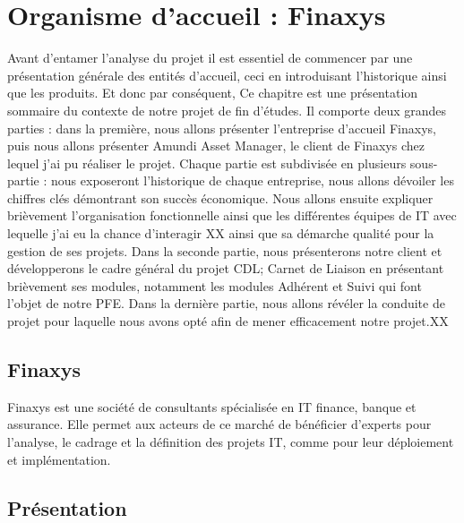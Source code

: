 \setlength{\parskip}{0.8em}



\chapter{Organisme d’accueil : Finaxys} %

\label{Chapter01} %

\par
Avant d'entamer l’analyse du projet il est essentiel de commencer par une présentation générale des entités d’accueil, ceci en introduisant l'historique ainsi que les produits. Et donc par conséquent, Ce chapitre est une présentation sommaire du contexte de notre projet de fin d’études. Il comporte deux grandes parties : dans la première, nous allons présenter l’entreprise d’accueil Finaxys, puis nous allons présenter Amundi Asset Manager, le client de Finaxys chez lequel j'ai pu réaliser le projet.
Chaque partie est subdivisée en plusieurs sous-partie : nous exposeront l'historique de chaque entreprise, nous allons dévoiler les chiffres clés démontrant son succès économique. Nous allons ensuite expliquer brièvement l'organisation fonctionnelle ainsi que les différentes équipes de IT avec lequelle j'ai eu la chance d'interagir XX ainsi que sa démarche qualité pour la gestion de ses projets. Dans la seconde partie, nous présenterons notre client et développerons le cadre général du projet CDL; Carnet de Liaison en présentant brièvement ses modules, notamment les modules Adhérent et Suivi qui font l’objet de notre PFE. Dans la dernière partie, nous allons révéler la conduite de projet pour laquelle nous avons opté afin de mener efficacement notre projet.XX

\section{Finaxys}
\par
Finaxys est une société de consultants spécialisée en IT finance, banque et assurance. Elle permet aux acteurs de ce marché de bénéficier d’experts pour l’analyse, le cadrage et la définition des projets IT, comme pour leur déploiement et implémentation.

\section{Présentation}


